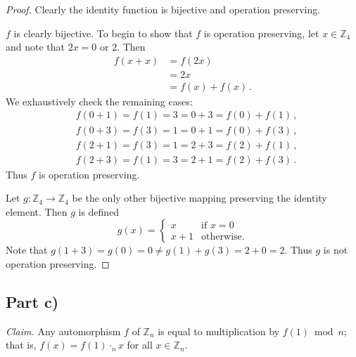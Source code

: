 \documentclass{abrice}
\newcommand{\Z}{\mathbb{Z}}
\newcommand{\Claim}{\emph{Claim.}\xspace}%
\begin{document}
\begin{proof}
  Clearly the identity function is bijective and operation preserving.

  $f$ is clearly bijective. To begin to show that $f$ is operation preserving, let $x \in
  \Z_4$ and note that $2x = 0$ or $2$. Then
  \begin{align*}
    f(x + x)
    &= f(2x) \\
    &= 2x \\
    &= f(x) + f(x)\, .
  \end{align*}
  We exhaustively check the remaining cases:
  \begin{align*}
    &f(0 + 1) = f(1) = 3 = 0 + 3 = f(0) + f(1)\, , \\
    &f(0 + 3) = f(3) = 1 = 0 + 1 = f(0) + f(3)\, , \\
    &f(2 + 1) = f(3) = 1 = 2 + 3 = f(2) + f(1)\, , \\
    &f(2 + 3) = f(1) = 3 = 2 + 1 = f(2) + f(3)\, .
  \end{align*}
  Thus $f$ is operation preserving.

  Let $g : \Z_4 \to \Z_4$ be the only other bijective mapping preserving the
  identity element. Then $g$ is defined
  \[
    g(x) =
    \begin{cases}
      x &\text{if } x = 0 \\
      x + 1 &\text{otherwise.}
    \end{cases}
  \]
  Note that $g(1 + 3) = g(0) = 0 \neq g(1) + g(3) = 2 + 0 = 2$. Thus $g$ is not
  operation preserving.
\end{proof}


\subsection{Part c)}

\Claim Any automorphism $f$ of $\Z_n$ is equal to multiplication by $f(1) \bmod
n$; that is, $f(x) = f(1) \cdot_n x$ for all $x \in \Z_n$.
\end{document}
